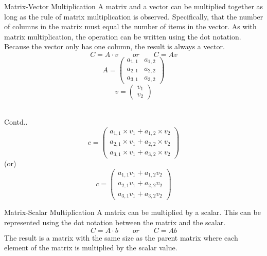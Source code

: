 \documentclass{beamer}
\begin{document}
\begin{frame}
\begin{block}{Matrix-Vector Multiplication}
    A matrix and a vector can be multiplied together as long as the rule of matrix multiplication is observed. Specifically, that the number of columns in the matrix must equal the number of items in the vector. As with matrix multiplication, the operation can be written using the dot notation. Because the vector only has one column, the result is always a vector.
    	\begin{equation*}
    		C = A \cdot v \qquad or \qquad C = Av
    	\end{equation*}
    \begin{equation*}
   		A = \begin{pmatrix}
   				a_{1,1} & a_{1,2} \\
   				a_{2,1} & a_{2,2} \\
   				a_{3,1} & a_{3,2} 
   			\end{pmatrix}
   	\end{equation*}
   	\begin{equation*}
   		v = \begin{pmatrix}
   				v_{1} \\
   				v_{2} 
   			\end{pmatrix}
   	\end{equation*}\\
\end{block}
\end{frame}
\begin{frame}
\begin{block}{Contd..}
   	\begin{equation*}
   		c = \begin{pmatrix}
   				a_{1,1} \times v_{1} + a_{1,2} \times v_{2} \\
    			a_{2,1} \times v_{1} + a_{2,2} \times v_{2} \\
    			a_{3,1} \times v_{1} + a_{3,2} \times v_{2}
   			\end{pmatrix}
   	\end{equation*}
   	(or)
   	\begin{equation*}
   		c = \begin{pmatrix}
   				a_{1,1}v_{1} + a_{1,2}v_{2} \\
    			a_{2,1}v_{1} + a_{2,2}v_{2} \\
    			a_{3,1}v_{1} + a_{3,2}v_{2}
   			\end{pmatrix}
   	\end{equation*}
\end{block}
\begin{block}{Matrix-Scalar Multiplication}
    A matrix can be multiplied by a scalar. This can be represented using the dot notation between the matrix and the scalar.
    	\begin{equation*}
    		C = A \cdot b \qquad or \qquad C = Ab
    	\end{equation*}
    The result is a matrix with the same size as the parent matrix where each element of the matrix is multiplied by the scalar value.
\end{block}
\end{frame}
\end{document}

